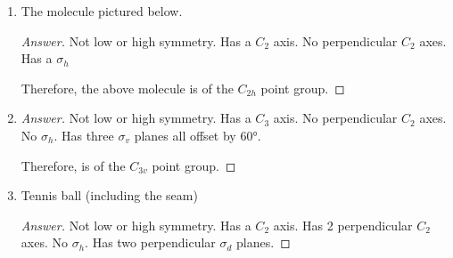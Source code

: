 \documentclass[../psets.tex]{subfiles}
\begin{document}
\begin{enumerate}[label={\Roman*)}]
\begin{enumerate}[label={\alph*)}]
\begin{proof}[Answer]
            Therefore, the above molecule is of the $\boxed{C_{2h}}$ point group.
        \end{proof}
        \item The molecule pictured below.
        \begin{center}
            \vspace{1em}
            \vspace{1em}
        \end{center}
        \begin{proof}[Answer]
            Not low or high symmetry. Has a $C_2$ axis. No perpendicular $C_2$ axes. Has a $\sigma_h$\par
            Therefore, the above molecule is of the $\boxed{C_{2h}}$ point group.
        \end{proof}
        \item {}
        \begin{proof}[Answer]
            Not low or high symmetry. Has a $C_3$ axis. No perpendicular $C_2$ axes. No $\sigma_h$. Has three $\sigma_v$ planes all offset by $\ang{60}$.\par
            Therefore,  is of the $\boxed{C_{3v}}$ point group.
        \end{proof}
        \item Tennis ball (including the seam)
        \begin{proof}[Answer]
            Not low or high symmetry. Has a $C_2$ axis. Has 2 perpendicular $C_2$ axes. No $\sigma_h$. Has two perpendicular $\sigma_d$ planes.\par

\end{proof}
\end{enumerate}
\end{enumerate}
\end{document}
